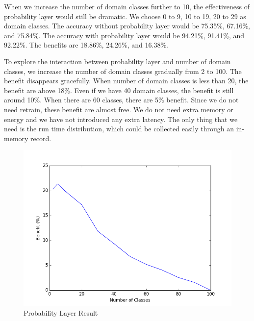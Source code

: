 \documentclass{article}
\begin{document}
When we increase the number of domain classes further to 10, the effectiveness of probability layer would still be dramatic. We choose 0 to 9, 10 to 19, 20 to 29 as domain classes. The accuracy without probability layer would be 75.35\%, 67.16\%, and 75.84\%. The accuracy with probability layer would be 94.21\%, 91.41\%, and 92.22\%. The benefits are 18.86\%, 24.26\%, and 16.38\%.

To explore the interaction between probability layer and number of domain classes, we increase the number of domain classes gradually from 2 to 100. The benefit disappears gracefully. When number of domain classes is less than 20, the benefit are above 18\%. Even if we have 40 domain classes, the benefit is still around 10\%. When there are 60 classes, there are 5\% benefit. Since we do not need retrain, these benefit are almost free. We do not need extra memory or energy and we have not introduced any extra latency. The only thing that we need is the run time distribution, which could be collected easily through an in-memory record.


\begin{figure}
\includegraphics[scale=0.43]{figure_1.png}
\caption{Probability Layer Result}
\label{fig:ProbabilityLayer}
\end{figure}
\end{document}
